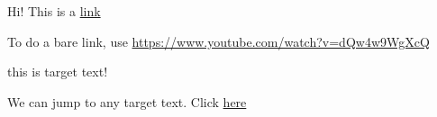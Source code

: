 \documentclass[12pt]{report}
\begin{document}
Hi! This is a \href{https://www.youtube.com/watch?v=dQw4w9WgXcQ}{link}

To do a bare link, use \url{https://www.youtube.com/watch?v=dQw4w9WgXcQ}

\hypertarget{the sentence}{this is target text!}

\pagebreak 
We can jump to any target text. Click \hyperlink{thesentence}{here}
\end{document}
